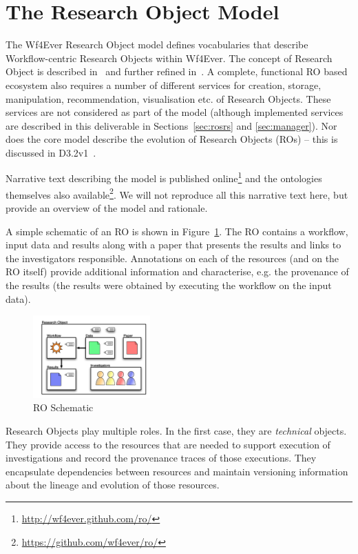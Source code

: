 \section{The Research Object Model}
\label{sec:model}

The Wf4Ever Research Object model defines vocabularies that describe Workflow-centric Research Objects within Wf4Ever. The concept of Research Object is described in~\cite{bechhofer11:not-enough} and further refined in~\cite{belhajjame12:citizens}. A complete, functional RO based ecosystem also requires a number of different services for creation, storage, manipulation, recommendation, visualisation etc. of Research Objects. These services are not considered as part of the model (although implemented services are described in this deliverable in Sections~\ref{sec:rosrs} and \ref{sec:manager}). Nor does the core model describe the evolution of Research Objects (ROs) -- this is discussed in D3.2v1~\cite{D3.2v1}.

Narrative text describing the model is published online\footnote{\url{http://wf4ever.github.com/ro/}} and the ontologies themselves also available\footnote{\url{https://github.com/wf4ever/ro/}}. We will not reproduce all this narrative text here, but provide an overview of the model and rationale.

A simple schematic of an RO is shown in Figure~\ref{fig:ro}. The RO contains a workflow, input data and results along with a paper that presents the results and links to the investigators responsible. Annotations on each of the resources (and on the RO itself) provide additional information and characterise, e.g. the provenance of the results (the results were obtained by executing the workflow on the input data). 

\begin{figure}[ht]
  \centering
  \includegraphics[width=0.4\textwidth]{Figures/RO-cartoon}
  \caption{RO Schematic}
  \label{fig:ro}
\end{figure}
 Research Objects play multiple roles. In the first case, they are \emph{technical} objects. They provide access to the resources that are needed to support execution of investigations and record the provenance traces of those executions. They encapsulate dependencies between resources and maintain versioning information about the lineage and evolution of those resources.

